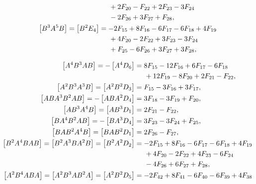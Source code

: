 \documentclass[12pt]{article}
\begin{document}
\begin{equation}
\begin{aligned}
    &\hspace{0.5cm} + 2 F_{20} - F_{22} + 2 F_{23} - 3 F_{24} \\
    &\hspace{0.5cm} - 2 F_{26} + 3 F_{27} + F_{28}, \\
    \left [ B^{3} A^{5} B \right ] = \left [ B^{2} E_{4} \right ] &= - 2 F_{15} + 8 F_{16} - 6 F_{17} - 6 F_{18} + 4 F_{19} \\
    &\hspace{0.5cm} + 4 F_{20} - 2 F_{22} + 3 F_{23} - 3 F_{24} \\
    &\hspace{0.5cm} + F_{25} - 6 F_{26} + 3 F_{27} + 3 F_{28},
  \end{aligned}
\end{equation}


\begin{equation}
  \begin{aligned}
    \nonumber
    \left [ A^{4} B^{3} A B \right ] = - \left [ A^{4} D_{6} \right ] &= 8 F_{15} - 12 F_{16} + 6 F_{17} - 6 F_{18} \\
    &\hspace{0.5cm} + 12 F_{19} - 8 F_{20} + 2 F_{21} - F_{22}, \\
    \left [ A^{2} B^{3} A^{3} B \right ] = \left [ A^{2} B^{2} D_{3} \right ] &= F_{15} - 3 F_{16} + 3 F_{17}, \\
    \left [ A B A^{3} B^{2} A B \right ] = - \left [ A B A^{2} D_{4} \right ] &= 3 F_{18} - 3 F_{19} + F_{20}, \\
    \left [ A B^{3} A^{4} B \right ] = \left [ A B^{3} D_{1} \right ] &= 2 F_{21} - F_{22}, \\
    \left [ B A^{4} B^{2} A B \right ] = - \left [ B A^{3} D_{4} \right ] &= 3 F_{23} - 3 F_{24} + F_{25}, \\
    \left [ B A B^{2} A^{4} B \right ] = \left [ B A B^{2} D_{1} \right ] &= 2 F_{26} - F_{27}, \\
    \left [ B^{2} A^{4} B A B \right ] = \left [ B^{2} A^{3} B A^{2} B \right ] = \left [ B^{2} A^{2} D_{2} \right ] &= - 2 F_{15} + 8 F_{16} - 6 F_{17} - 6 F_{18} + 4 F_{19} \\
    &\hspace{0.5cm} + 4 F_{20} - 2 F_{22} + 4 F_{23} - 6 F_{24} \\
    &\hspace{0.5cm} - 4 F_{26} + 6 F_{27} + F_{28}, \\
    \left [ A^{2} B^{4} A B A \right ] = \left [ A^{2} B^{3} A B^{2} A \right ] = \left [ A^{2} B^{2} D_{5} \right ] &= - 2 F_{42} + 8 F_{41} - 6 F_{40} - 6 F_{39} + 4 F_{38} \\

\end{aligned}
\end{equation}
\end{document}

